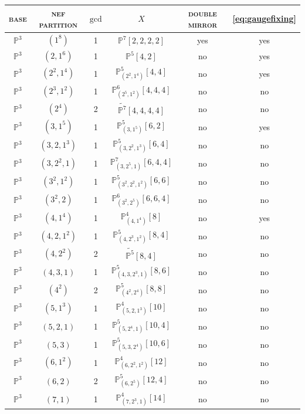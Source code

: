 \documentclass[12pt,a4paper,oneside]{amsart}
\numberwithin{equation}{section}
\theoremstyle{definition}
\theoremstyle{remark}
\newcommand{\cP}{\mathbb{P}}
\begin{document}
\begin{table}[th]
\centering
\begin{tabular}{|c |c |c |c | c| c|}
	\hline
	\textsc{base} & \textsc{nef partition} & $\mathrm{gcd}$ & $X$ & \textsc{double mirror} & \eqref{eq:gaugefixing} \\
	\hline
	$\cP^{3}$ & $(1^8)$ & 1 &$\cP^{7} [2,2,2,2]$ & yes & yes \\
	$\cP^{3}$ & $(2, 1^6)$ & 1 & $\cP^{5} [4,2]$ & no & yes \\
	$\cP^{3}$ & $(2^2, 1^4)$ & 1 & $\cP^{5}_{(2^2,1^4)} [4,4]$ & no & yes \\
	$\cP^{3}$ & $(2^3,1^2)$ & 1 & $\cP^{6}_{(2^5,1^2)} [4,4,4]$ & no & no \\
	$\cP^{3}$ & $(2^4)$ & 2 & $\widetilde{\cP^{7}} [4,4,4,4]$ & no & no \\
	$\cP^{3}$ & $(3,1^5)$ & 1 & $\cP^{5}_{(3,1^5)} [6,2]$ & no & yes \\
	$\cP^{3}$ & $(3,2,1^3)$ & 1 & $\cP^{5}_{(3,2^2,1^3)} [6,4]$ & no & no \\
	$\cP^{3}$ & $(3,2^2,1)$ & 1 & $\cP^{7}_{(3,2^5,1)} [6,4,4]$ & no & no \\
	$\cP^{3}$ & $(3^2,1^2)$ & 1 & $\cP_{(3^2,2^2,1^2)}^{5} [6,6]$ & no & no \\
	$\cP^{3}$ & $(3^2,2)$ & 1 & $\cP^{6}_{(3^2,2^5)} [6,6,4]$ & no & no \\
	$\cP^{3}$ & $(4,1^4)$ & 1 & $\cP^{4}_{(4,1^4)} [8]$ & no & yes \\
	$\cP^{3}$ & $(4,2,1^2)$ & 1 & $\cP_{(4,2^3,1^2)}^{5} [8,4]$ & no & no \\
	$\cP^{3}$ & $(4,2^2)$ & 2 & $\widetilde{\cP^{5}} [8,4]$ & no & no \\
	$\cP^{3}$ & $(4,3,1)$ & 1 & $\cP_{(4,3,2^3,1)}^{5} [8,6]$ & no & no \\
	$\cP^{3}$ & $(4^2)$ & 2 & $\cP^{5}_{(4^2,2^4)} [8,8]$ & no & no \\
	$\cP^{3}$ & $(5, 1^3)$ & 1 & $\cP^{4}_{(5,2,1^3)} [10]$ & no & no \\
	$\cP^{3}$ & $(5,2,1)$ & 1 & $\cP^{5}_{(5,2^4,1)} [10,4]$ & no & no \\
	$\cP^{3}$ & $(5,3)$ & 1 & $\cP^{5}_{(5,3,2^4)} [10,6]$ & no & no \\
	$\cP^{3}$ & $(6,1^2)$ & 1 & $\cP^{4}_{(6,2^2,1^2)} [12]$ & no & no \\	
	$\cP^{3}$ & $(6,2)$ & 2 & $\cP^{5}_{(6,2^5)} [12,4]$ & no & no \\
	$\cP^{3}$ & $(7,1)$ & 1 & $\cP^{4}_{(7,2^3,1)} [14]$ & no & no \\

\end{tabular}
\end{table}
\end{document}
